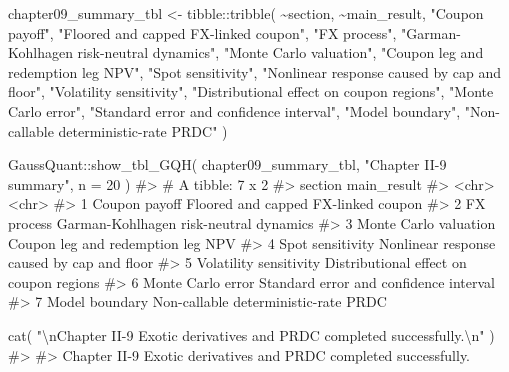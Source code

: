 \documentclass[
  letterpaper,
  DIV=11,
  numbers=noendperiod]{scrreprt}
\newenvironment{Shaded}{\begin{snugshade}}{\end{snugshade}}
\newcommand{\AttributeTok}[1]{\textcolor[rgb]{0.40,0.45,0.13}{#1}}
\newcommand{\CommentTok}[1]{\textcolor[rgb]{0.37,0.37,0.37}{#1}}
\newcommand{\DecValTok}[1]{\textcolor[rgb]{0.68,0.00,0.00}{#1}}
\newcommand{\FunctionTok}[1]{\textcolor[rgb]{0.28,0.35,0.67}{#1}}
\newcommand{\NormalTok}[1]{\textcolor[rgb]{0.00,0.23,0.31}{#1}}
\newcommand{\OtherTok}[1]{\textcolor[rgb]{0.00,0.23,0.31}{#1}}
\newcommand{\SpecialCharTok}[1]{\textcolor[rgb]{0.37,0.37,0.37}{#1}}
\newcommand{\StringTok}[1]{\textcolor[rgb]{0.13,0.47,0.30}{#1}}
\begin{document}
\begin{Shaded}
\begin{Highlighting}[]
\NormalTok{chapter09\_summary\_tbl }\OtherTok{\textless{}{-}}\NormalTok{ tibble}\SpecialCharTok{::}\FunctionTok{tribble}\NormalTok{(}
  \SpecialCharTok{\textasciitilde{}}\NormalTok{section,                 }\SpecialCharTok{\textasciitilde{}}\NormalTok{main\_result,}
  \StringTok{"Coupon payoff"}\NormalTok{,           }\StringTok{"Floored and capped FX{-}linked coupon"}\NormalTok{,}
  \StringTok{"FX process"}\NormalTok{,              }\StringTok{"Garman{-}Kohlhagen risk{-}neutral dynamics"}\NormalTok{,}
  \StringTok{"Monte Carlo valuation"}\NormalTok{,   }\StringTok{"Coupon leg and redemption leg NPV"}\NormalTok{,}
  \StringTok{"Spot sensitivity"}\NormalTok{,        }\StringTok{"Nonlinear response caused by cap and floor"}\NormalTok{,}
  \StringTok{"Volatility sensitivity"}\NormalTok{,  }\StringTok{"Distributional effect on coupon regions"}\NormalTok{,}
  \StringTok{"Monte Carlo error"}\NormalTok{,       }\StringTok{"Standard error and confidence interval"}\NormalTok{,}
  \StringTok{"Model boundary"}\NormalTok{,          }\StringTok{"Non{-}callable deterministic{-}rate PRDC"}
\NormalTok{)}

\NormalTok{GaussQuant}\SpecialCharTok{::}\FunctionTok{show\_tbl\_GQH}\NormalTok{(}
\NormalTok{  chapter09\_summary\_tbl,}
  \StringTok{"Chapter II{-}9 summary"}\NormalTok{,}
  \AttributeTok{n =} \DecValTok{20}
\NormalTok{)}
\CommentTok{\#\textgreater{} \# A tibble: 7 x 2}
\CommentTok{\#\textgreater{}   section                main\_result                               }
\CommentTok{\#\textgreater{}   \textless{}chr\textgreater{}                  \textless{}chr\textgreater{}                                     }
\CommentTok{\#\textgreater{} 1 Coupon payoff          Floored and capped FX{-}linked coupon       }
\CommentTok{\#\textgreater{} 2 FX process             Garman{-}Kohlhagen risk{-}neutral dynamics    }
\CommentTok{\#\textgreater{} 3 Monte Carlo valuation  Coupon leg and redemption leg NPV         }
\CommentTok{\#\textgreater{} 4 Spot sensitivity       Nonlinear response caused by cap and floor}
\CommentTok{\#\textgreater{} 5 Volatility sensitivity Distributional effect on coupon regions   }
\CommentTok{\#\textgreater{} 6 Monte Carlo error      Standard error and confidence interval    }
\CommentTok{\#\textgreater{} 7 Model boundary         Non{-}callable deterministic{-}rate PRDC}

\FunctionTok{cat}\NormalTok{(}
  \StringTok{"}\SpecialCharTok{\textbackslash{}n}\StringTok{Chapter II{-}9 Exotic derivatives and PRDC completed successfully.}\SpecialCharTok{\textbackslash{}n}\StringTok{"}
\NormalTok{)}
\CommentTok{\#\textgreater{} }
\CommentTok{\#\textgreater{} Chapter II{-}9 Exotic derivatives and PRDC completed successfully.}
\end{Highlighting}
\end{Shaded}
\end{document}
